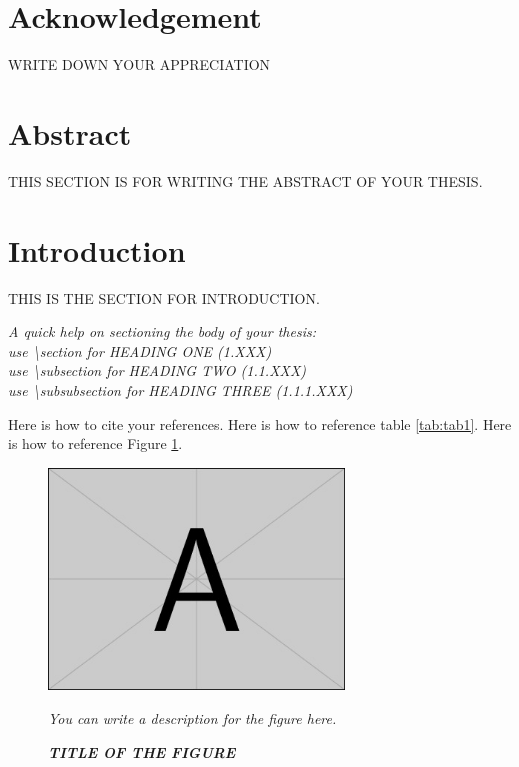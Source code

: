 \documentclass[a4paper, 12pt]{article}
\begin{document}

\clearpage
\phantom{}
\pagestyle{empty}
\clearpage

\section*{Acknowledgement}
\noindent WRITE DOWN YOUR APPRECIATION
\thispagestyle{empty} %
\clearpage

\section*{Abstract}
THIS SECTION IS FOR WRITING THE ABSTRACT OF YOUR THESIS.

\clearpage
\tableofcontents
\listoffigures
\listoftables
\clearpage

\pagestyle{fancy}

\section{Introduction}
THIS IS THE SECTION FOR INTRODUCTION.\cite{knuth1984texbook}

\textit{\noindent A quick help on sectioning the body of your thesis: \\
use \textbackslash section for HEADING ONE (1.XXX)\\
use \textbackslash subsection for HEADING TWO (1.1.XXX)\\
use \textbackslash subsubsection for HEADING THREE (1.1.1.XXX)}

Here is how to cite your references.\cite{lamport1986latex}
Here is how to reference table \ref{tab:tab1}.
Here is how to reference Figure \ref{fig:fig1}.

\begin{figure}[H]
  \centering
  \includegraphics[width=0.7\textwidth]{example-image-a.jpg}
  \caption{\small \textbf{\textit{TITLE OF THE FIGURE}}}
  \footnotesize \textit{You can write a description for the figure here.\cite{website2023example}}
  \label{fig:fig1}
\end{figure}
\end{document}
